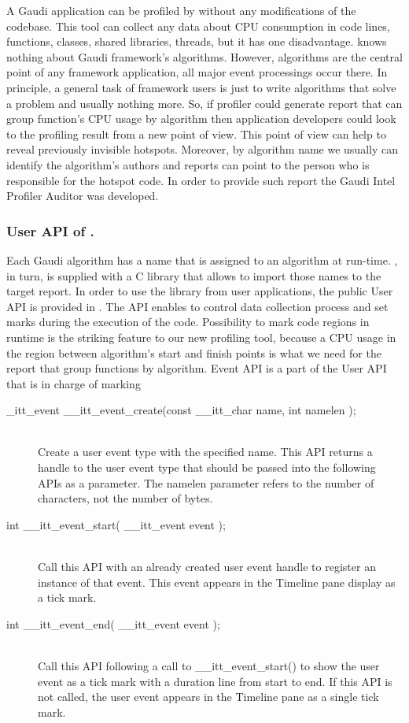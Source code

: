 \documentclass[a4paper]{jpconf}
\begin{document}
A Gaudi application can be profiled by \amp  without any modifications of the codebase.  This tool can collect any data about CPU consumption in code lines, functions, classes, shared libraries, threads, but it has one disadvantage. \amp knows nothing about Gaudi framework’s algorithms. However, algorithms are the central point of any framework application, all major event processings occur there. In principle, a general task of framework users is just to write algorithms that solve a problem and usually nothing more. So, if profiler could generate report that can group function’s CPU usage by algorithm then application developers could look to the profiling result from a new point of view. This point of view can help to reveal previously invisible hotspots. Moreover, by algorithm name we usually can identify the algorithm’s authors and reports can point to the person who is responsible for the hotspot code. In order to provide such report the Gaudi Intel Profiler Auditor was developed.

\subsubsection{User API of \iamp.}

Each Gaudi algorithm has a name that is assigned to an algorithm at run-time. \amp, in turn, is supplied with a C library that allows to import those names to the target report. In order to use the library from user applications, the public User API is provided in \amp. The API enables to control data collection process and set marks during the execution of the code. Possibility to mark code regions in runtime is the striking feature to our new profiling tool, because a CPU usage in the region between algorithm’s start and finish points is what we need for the report that group functions by algorithm. Event API is a part of the User API  that is in charge of marking 

\begin{description}
\item[\_itt\_event \_\_itt\_event\_create(const \_\_itt\_char \*name, int namelen );] \hfill \\
Create a user event type with the specified name. This API returns a handle to the user event type that should be passed into the following APIs as a parameter. The namelen parameter refers to the number of characters, not the number of bytes.

\item[int \_\_itt\_event\_start( \_\_itt\_event event );] \hfill \\
Call this API with an already created user event handle to register an instance of that event. This event appears in the Timeline pane display as a tick mark.

\item[int \_\_itt\_event\_end( \_\_itt\_event event );] \hfill \\
Call this API following a call to \_\_itt\_event\_start() to show the user event as a tick mark with a duration line from start to end. If this API is not called, the user event appears in the Timeline pane as a single tick mark.
\end{description}
\end{document}

